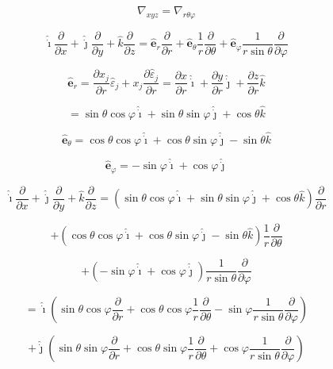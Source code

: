 \documentclass[12pt]{article}
\begin{document}
\[
    \nabla_{xyz} = \nabla_{r \theta \varphi }
\]

\[
    \hat{\dot{\imath}} \frac{\partial}{\partial x}
    + \hat{\dot{\jmath}} \frac{\partial}{\partial y}
    +  \hat{k} \frac{\partial}{\partial z} = \hat{\textbf{e}}_r \frac{\partial}{\partial r}
    + \hat{\textbf{e}}_\theta \frac{1}{r} \frac{\partial}{\partial \theta}
    + \hat{\textbf{e}}_\varphi \frac{1}{r \sin{\theta}} \frac{\partial}{\partial \varphi}
\]

\[
    \hat{\textbf{e}}_r = \frac{\partial x_j}{\partial r} \hat{\varepsilon}_j
    + x_j \frac{\partial \hat{\varepsilon}_j}{\partial r} = \frac{\partial x}{\partial r} \hat{\dot{\imath}}
    + \frac{\partial y}{\partial r} \hat{\dot{\jmath}} + \frac{\partial z}{\partial r} \hat{k}
\]

\[
    = \sin{\theta} \cos{\varphi} \hat{\dot{\imath}} + \sin{\theta} \sin{\varphi} \hat{\dot{\jmath}}
    + \cos{\theta} \hat{k}
\]

\[
    \hat{\textbf{e}}_\theta = \cos{\theta} \cos{\varphi} \hat{\dot{\imath}}
    + \cos{\theta} \sin{\varphi} \hat{\dot{\jmath}} - \sin{\theta} \hat{k}
\]

\[
    \hat{\textbf{e}}_\varphi = -\sin{\varphi} \hat{\dot{\imath}} + \cos{\varphi} \hat{\dot{\jmath}}
\]

\[
    \hat{\dot{\imath}} \frac{\partial}{\partial x} + \hat{\dot{\jmath}} \frac{\partial}{\partial y}
    +  \hat{k} \frac{\partial}{\partial z} =
    \left(
    \sin{\theta} \cos{\varphi} \hat{\dot{\imath}}
    + \sin{\theta} \sin{\varphi} \hat{\dot{\jmath}}
    + \cos{\theta} \hat{k}
    \right)  \frac{\partial}{\partial r}
\]

\[
    + \left(
    \cos{\theta} \cos{\varphi} \hat{\dot{\imath}} + \cos{\theta} \sin{\varphi} \hat{\dot{\jmath}}
    - \sin{\theta} \hat{k}
    \right) \frac{1}{r} \frac{\partial}{\partial \theta}
\]

\[
    + \left(-\sin{\varphi} \hat{\dot{\imath}} + \cos{\varphi} \hat{\dot{\jmath}}\right)
    \frac{1}{r \sin{\theta}} \frac{\partial}{\partial \varphi}
\]

\[
    = \hat{\dot{\imath}}
    \left(
    \sin{\theta} \cos{\varphi} \frac{\partial}{\partial r}
    + \cos{\theta} \cos{\varphi} \frac{1}{r} \frac{\partial}{\partial \theta}
    - \sin{\varphi} \frac{1}{r \sin{\theta}} \frac{\partial}{\partial \varphi}
    \right)
\]

\[
    + \hat{\dot{\jmath}}
    \left(
    \sin{\theta} \sin{\varphi} \frac{\partial}{\partial r}
    + \cos{\theta} \sin{\varphi} \frac{1}{r} \frac{\partial}{\partial \theta}
    + \cos{\varphi} \frac{1}{r \sin{\theta}} \frac{\partial}{\partial \varphi}
    \right)
\]
\end{document}
